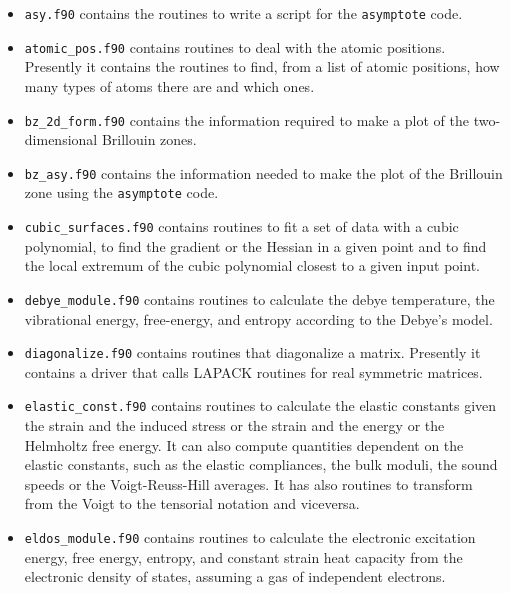\documentclass[12pt,a4paper]{article}
\begin{document}
\begin{itemize}

\item
\texttt{asy.f90} contains the routines to write a script for the
\texttt{asymptote} code.

\item
\texttt{atomic\_pos.f90} contains routines to deal with the atomic positions.
Presently it contains the routines to find, from a list of atomic positions,
how many types of atoms there are and which ones.

\item
\texttt{bz\_2d\_form.f90} contains the information required to make a
plot of the two-dimensional Brillouin zones.

\item
\texttt{bz\_asy.f90} contains the information needed to make the plot       
of the Brillouin zone using the \texttt{asymptote} code.      

\item
\texttt{cubic\_surfaces.f90} contains routines to fit a set of data
with a cubic polynomial, to find the gradient or the Hessian in 
a given point and to find the local extremum of the cubic polynomial
closest to a given input point. 

\item
\texttt{debye\_module.f90} contains routines to calculate the debye 
temperature, the vibrational energy, free-energy, and entropy according
to the Debye's model.

\item
\texttt{diagonalize.f90} contains routines that diagonalize a matrix.
Presently it contains a driver that calls LAPACK routines
for real symmetric matrices.

\item
\texttt{elastic\_const.f90} contains routines to calculate the elastic
constants given the strain and the induced stress or the strain and
the energy or the Helmholtz free energy. It can also compute
quantities dependent on the elastic constants, such as the elastic 
compliances, the bulk moduli, the sound speeds or the Voigt-Reuss-Hill 
averages. It has also routines to transform from the Voigt to the 
tensorial notation and viceversa.

\item
\texttt{eldos\_module.f90} contains routines to calculate the electronic
excitation energy, free energy, entropy, and constant strain heat capacity
from the electronic density of states, assuming a gas of independent 
electrons.   


\end{itemize}
\end{document}
